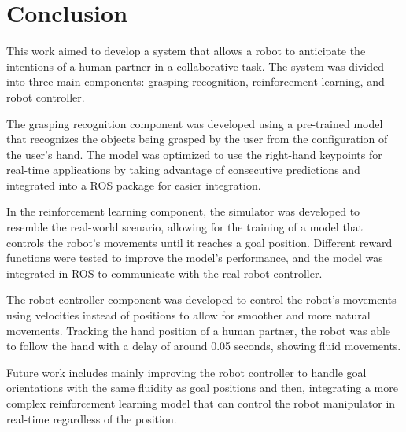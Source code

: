 \section{Conclusion}

This work aimed to develop a system that allows a robot to anticipate the intentions of a human partner in a collaborative task. The system was divided into three main components: grasping recognition, reinforcement learning, and robot controller.

The grasping recognition component was developed using a pre-trained model that recognizes the objects being grasped by the user from the configuration of the user's hand. The model was optimized to use the right-hand keypoints for real-time applications by taking advantage of consecutive predictions and integrated into a ROS package for easier integration.

In the reinforcement learning component, the simulator was developed to resemble the real-world scenario, allowing for the training of a model that controls the robot's movements until it reaches a goal position. Different reward functions were tested to improve the model's performance, and the model was integrated in ROS to communicate with the real robot controller.

The robot controller component was developed to control the robot's movements using velocities instead of positions to allow for smoother and more natural movements. Tracking the hand position of a human partner, the robot was able to follow the hand with a delay of around 0.05 seconds, showing fluid movements.

Future work includes mainly improving the robot controller to handle goal orientations with the same fluidity as goal positions and then, integrating a more complex reinforcement learning model that can control the robot manipulator in real-time regardless of the position.
